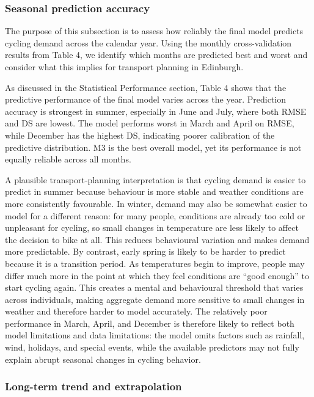 \documentclass[
]{article}
\begin{document}
\subsubsection{Seasonal prediction accuracy}\label{seasonal-prediction-accuracy}

The purpose of this subsection is to assess how reliably the final model predicts cycling demand across the calendar year. Using the monthly cross-validation results from Table 4, we identify which months are predicted best and worst and consider what this implies for transport planning in Edinburgh.

As discussed in the Statistical Performance section, Table 4 shows that the predictive performance of the final model varies across the year. Prediction accuracy is strongest in summer, especially in June and July, where both RMSE and DS are lowest. The model performs worst in March and April on RMSE, while December has the highest DS, indicating poorer calibration of the predictive distribution. M3 is the best overall model, yet its performance is not equally reliable across all months.

A plausible transport-planning interpretation is that cycling demand is easier to predict in summer because behaviour is more stable and weather conditions are more consistently favourable. In winter, demand may also be somewhat easier to model for a different reason: for many people, conditions are already too cold or unpleasant for cycling, so small changes in temperature are less likely to affect the decision to bike at all. This reduces behavioural variation and makes demand more predictable. By contrast, early spring is likely to be harder to predict because it is a transition period. As temperatures begin to improve, people may differ much more in the point at which they feel conditions are ``good enough'' to start cycling again. This creates a mental and behavioural threshold that varies across individuals, making aggregate demand more sensitive to small changes in weather and therefore harder to model accurately. The relatively poor performance in March, April, and December is therefore likely to reflect both model limitations and data limitations: the model omits factors such as rainfall, wind, holidays, and special events, while the available predictors may not fully explain abrupt seasonal changes in cycling behavior.

\subsubsection{Long-term trend and extrapolation}\label{long-term-trend-and-extrapolation}
\end{document}
